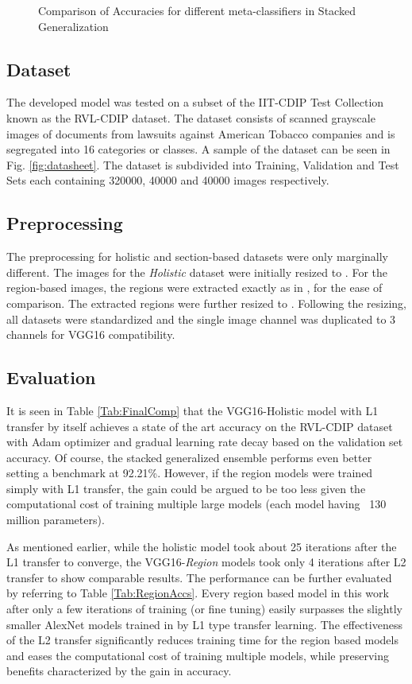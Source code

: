 \documentclass[10pt,conference,a4paper]{IEEEtran}
\begin{document}
\begin{figure}[t]
	\centering
	\caption{Comparison of Accuracies for different meta-classifiers in Stacked Generalization} \label{fig:stacking}
\end{figure}


\subsection{Dataset}
The developed model was tested on a subset of the IIT-CDIP Test Collection known as the RVL-CDIP dataset. The dataset consists of scanned grayscale images of documents from lawsuits against American Tobacco companies and is segregated into 16 categories or classes. A sample of the dataset can be seen in Fig. \ref{fig:datasheet}. The dataset is subdivided into Training, Validation and Test Sets each containing 320000, 40000 and 40000 images respectively.

\subsection{Preprocessing}
The preprocessing for holistic and section-based datasets were only marginally different. The images for the \textit{Holistic} dataset were initially resized to . For the region-based images, the regions were extracted exactly as in \cite{harley2015evaluation}, for the ease of comparison. The extracted regions were further resized to . Following the resizing, all datasets were standardized and the single image channel was duplicated to 3 channels for VGG16 compatibility.

\subsection{Evaluation}
It is seen in Table \ref{Tab:FinalComp} that the VGG16-Holistic model with L1 transfer by itself achieves a state of the art accuracy on the RVL-CDIP dataset with Adam optimizer and gradual learning rate decay based on the validation set accuracy. Of course, the stacked generalized ensemble performs even better setting a benchmark at 92.21\%. However, if the region models were trained simply with L1 transfer, the gain could be argued to be too less given the computational cost of training multiple large models (each model having ~130 million parameters).

As mentioned earlier, while the holistic model took about 25 iterations after the L1 transfer to converge, the VGG16-\textit{Region} models took only 4 iterations after L2 transfer to show comparable results. The performance can be further evaluated by referring to Table \ref{Tab:RegionAccs}. Every region based model in this work after only a few iterations of training (or fine tuning) easily surpasses the slightly smaller AlexNet models trained in \cite{harley2015evaluation} by L1 type transfer learning. The effectiveness of the L2 transfer significantly reduces training time for the region based models and eases the computational cost of training multiple models, while preserving benefits characterized by the gain in accuracy.
\end{document}
